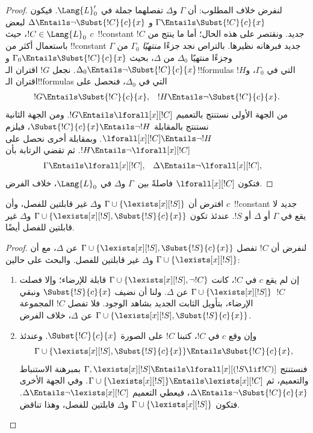 \documentclass[../../../include/open-logic-section]{subfiles}
\begin{document}
\begin{proof}
لنفرض خلاف المطلوب: أن $\Gamma$ و$\Delta$ تفصلهما
جملة في $\Lang{L}'_0$. فيكون
$\Gamma \Entails \Subst{!C}{c}{x}$ و
$\Delta \Entails \lnot \Subst{!C}{c}{x}$ لبعض
$!C \in \Lang{L}_0$، حيث $c$~!!{constant} جديد.
ونقتصر على هذه الحال؛ أما ما ينتج من $!C$ باستعمال أكثر
من !!{constant} جديد فبرهانه نظيرها.
بالتراص نجد جزءًا \emph{منتهيًا} $\Gamma_0$ من $\Gamma$
وجزءًا منتهيًا $\Delta_0$ من $\Delta$، بحيث
$\Gamma_0 \Entails \Subst{!C}{c}{x}$ و
$\Delta_0 \Entails \lnot \Subst{!C}{c}{x}$.
نجعل $!G$ اقتران الـ!!{formula}s التي في $\Gamma_0$،
و$!H$ اقتران الـ!!{formula}s التي في $\Delta_0$، فنحصل على
\begin{align*}
  !G & \Entails \Subst{!C}{c}{x}, & !H  \Entails \lnot \Subst{!C}{c}{x}.
\end{align*}
من الجهة الأولى نستنتج بالتعميم $!G \Entails \lforall[x][!C]$.
ومن الجهة الثانية نستنتج بالمقابلة
$\Subst{!C}{c}{x} \Entails \lnot !H$، فيلزم
$\lforall[x][!C] \Entails \lnot !H$.
وبمقابلة أخرى نحصل على $!H \Entails \lnot \lforall[x][!C]$.
ثم تقضي الرتابة بأن
\begin{align*}
  \Gamma &\Entails \lforall[x][!C], &
  \Delta & \Entails \lnot \lforall[x][!C],
\end{align*}
فتكون $\lforall[x][!C]$ فاصلةً بين~$\Gamma$ و$\Delta$ في $\Lang{L}_0$، خلاف الفرض.
\end{proof}

\begin{lem}
افترض أن $\Gamma \cup \{ \lexists[x][!S] \}$ و$\Delta$ غير قابلتين
للفصل، وأن $c$~!!{constant} جديد لا يقع في $\Gamma$ أو $\Delta$ أو
$!S$. عندئذ تكون
$\Gamma \cup \{ \lexists[x][!S], \Subst{!S}{c}{x} \}$ و$\Delta$
غير قابلتين للفصل أيضًا.
\end{lem}

\begin{proof}
لنفرض أن $!C$ تفصل
$\Gamma \cup \{\lexists[x][!S], \Subst{!S}{c}{x}\}$ عن $\Delta$،
مع أن $\Gamma \cup \{\lexists[x][!S] \}$ و$\Delta$
غير قابلتين للفصل. والبحث على حالين:
\begin{enumerate}
\item إن لم يقع $c$ في $!C$، كانت
  $\Gamma \cup \{\lexists[x][!S], \lnot!C \}$ قابلة للإرضاء؛
  وإلا فصلت $!C$~$\Gamma \cup \{\lexists[x][!S] \}$ عن $\Delta$.
  ولنا أن نضيف $\Subst{!S}{c}{x}$ ونبقي الإرضاء، بتأويل
  الثابت الجديد بشاهد الوجود. فلا تفصل $!C$
  المجموعة $\Gamma \cup \{ \lexists[x][!S], \Subst{!S}{c}{x} \}$
  عن $\Delta$، خلاف الفرض.
\item وإن وقع $c$ في $!C$، كتبنا $!C$ على الصورة
  $\Subst{!C}{c}{x}$. وعندئذ
  \[
  \Gamma \cup \{ \lexists[x][!S], \Subst{!S}{c}{x}\} \Entails \Subst{!C}{c}{x},
  \]
  فنستنتج $\Gamma, \lexists[x][!S] \Entails \lforall[x][(!S \lif !C)]$
  بمبرهنة الاستنباط والتعميم، ثم
  $\Gamma \cup \{ \lexists[x][!S] \} \Entails \lexists[x][!C]$.
  وفي الجهة الأخرى $\Delta \Entails \lnot \Subst{!C}{c}{x}$،
  فيعطي التعميم $\Delta \Entails \lnot \lexists[x][!C]$.
  فتكون $\Gamma \cup \{\lexists[x][!S] \}$ و$\Delta$
  قابلتين للفصل، وهذا تناقض.
\end{enumerate}
\end{proof}
\end{document}
